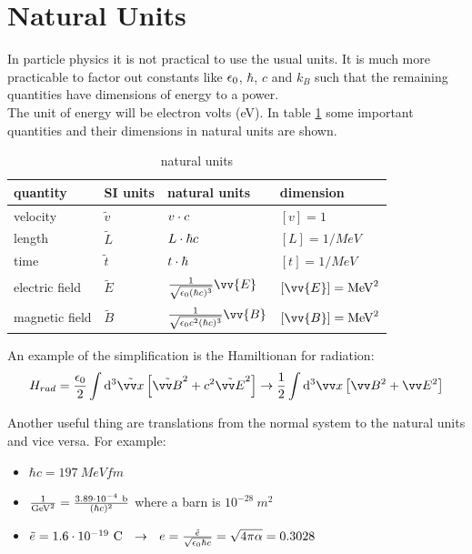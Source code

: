 \section{Natural Units}
In particle physics it is not practical to use the usual units. It is much more practicable to factor out constants like $\eps_0$, $\hbar$, $c$ and $k_B$ such that the remaining quantities have dimensions of energy to a power.\\
The unit of energy will be electron volts (eV). In table \ref{units} some important quantities and their dimensions in natural units are shown.
\begin{table}[H]
\centering
\begin{tabular}{l|lll}
quantity & SI units & natural units & dimension\\
\midrule
velocity & $\tilde{v}$ & $v \cc c$ & $[v] = 1$\\
length & $\tilde{L}$ & $L \cc \hbar c$ & $[L] = 1/\si{MeV}$\\
time & $\tilde{t}$ & $t\cc \hbar$ & $[t] = 1/\si{MeV}$\\
electric field & $\tilde{E}$ & $\frac{1}{\sqrt{\eps_0 (\hbar c)^3}} \vv{E}$ & $[\vv{E}] = \si{MeV}^2$\\
magnetic field & $\tilde{B}$ & $\frac{1}{\sqrt{\eps_0 c^2(\hbar c)^3}} \vv{B}$ &  $[\vv{B}] = \si{MeV}^2$\\
\bottomrule
\end{tabular}
\caption{natural units}
\label{units}
\end{table}
An example of the simplification is the Hamiltionan for radiation:
\[ H_{rad} = \frac{\eps_0}{2} \int\dd^3 \tilde{\vx} \left[ \tilde{\vE}^2 + c^2 \tilde{\vB}^2\right] \df \frac{1}{2} \int\dd^3 \vx \left[\vE^2 + \vB^2\right]\]

Another useful thing are translations from the normal system to the natural units and vice versa. For example:
\begin{itemize}
\item $\hbar c = 197~\si{MeV fm}$
\item $\frac{1}{\si{GeV}^2} = \frac{3.89\cc 10^{-4}~\si{b}}{(\hbar c)^2}$ where a barn is $10^{-28}~\si{m^2}$
\item $\tilde{e} = 1.6\cc 10^{-19} ~\si{C} ~~\df~~ e = \frac{\tilde{e}}{\sqrt{\eps_0 \hbar c}} = \sqrt{ 4 \pi \alpha} = 0.3028$
\end{itemize}

